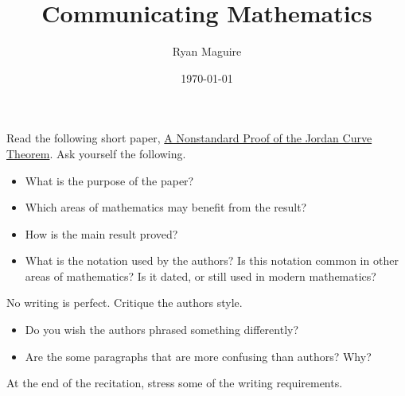 \documentclass{article}
\title{Communicating Mathematics}
\author{Ryan Maguire}
\date{\today}
\newif\ifsolution
\begin{document}
    \maketitle
    \ifsolution
        \color{blue}
        Ask the students what they should expect in their writings.
        Consider things such as:
        \begin{itemize}
            \item
                Length of the paper.
            \item
                How much can be assumed in their writing?
                They do not need to reinvent the wheel, but the reading
                should be mostly self-contained.
            \item
                Which symbols are allowed? Their papers should not
                overly abuse notation (symbols like $\forall$ or
                $\exists$) and should revert to English when possible.
                If symbols \textit{help} the reader, they can be used.
        \end{itemize}
        \color{black}
    \fi
    Read the following short paper,
    \href{%
        https://arxiv.org/pdf/math/9608204%
    }{A Nonstandard Proof of the Jordan Curve Theorem}.
    Ask yourself the following.
    \begin{itemize}
        \item
            What is the purpose of the paper?
        \item
            Which areas of mathematics may benefit from the result?
        \item
            How is the main result proved?
        \item
            What is the notation used by the authors? Is this notation
            common in other areas of mathematics? Is it dated, or still used
            in modern mathematics?
    \end{itemize}
    No writing is perfect. Critique the authors style.
    \begin{itemize}
        \item
            Do you wish the authors phrased something differently?
        \item
            Are the some paragraphs that are more confusing than authors? Why?
    \end{itemize}
    \ifsolution
    \color{blue}
        At the end of the recitation, stress some of the writing requirements.
\end{document}
